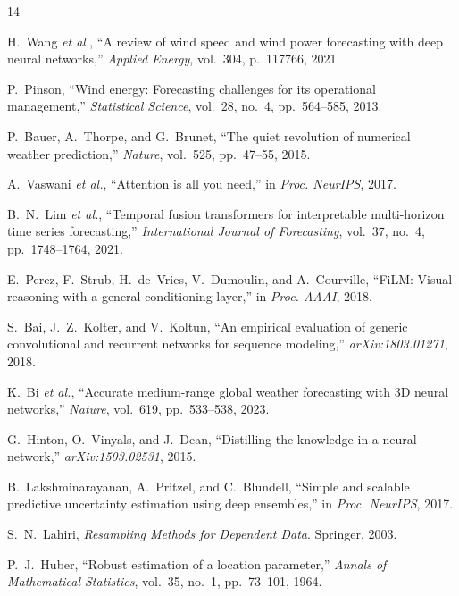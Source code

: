 \documentclass[conference]{IEEEtran}
\begin{document}

\begin{thebibliography}{14}

H.~Wang \textit{et al.}, ``A review of wind speed and wind power forecasting with deep neural networks,'' \textit{Applied Energy}, vol.~304, p.~117766, 2021.

P.~Pinson, ``Wind energy: Forecasting challenges for its operational management,'' \textit{Statistical Science}, vol.~28, no.~4, pp.~564--585, 2013.

P.~Bauer, A.~Thorpe, and G.~Brunet, ``The quiet revolution of numerical weather prediction,'' \textit{Nature}, vol.~525, pp.~47--55, 2015.

A.~Vaswani \textit{et al.}, ``Attention is all you need,'' in \textit{Proc. NeurIPS}, 2017.

B.~N.~Lim \textit{et al.}, ``Temporal fusion transformers for interpretable multi-horizon time series forecasting,'' \textit{International Journal of Forecasting}, vol.~37, no.~4, pp.~1748--1764, 2021.

E.~Perez, F.~Strub, H.~de~Vries, V.~Dumoulin, and A.~Courville, ``FiLM: Visual reasoning with a general conditioning layer,'' in \textit{Proc. AAAI}, 2018.

S.~Bai, J.~Z.~Kolter, and V.~Koltun, ``An empirical evaluation of generic convolutional and recurrent networks for sequence modeling,'' \textit{arXiv:1803.01271}, 2018.

K.~Bi \textit{et al.}, ``Accurate medium-range global weather forecasting with 3D neural networks,'' \textit{Nature}, vol.~619, pp.~533--538, 2023.

G.~Hinton, O.~Vinyals, and J.~Dean, ``Distilling the knowledge in a neural network,'' \textit{arXiv:1503.02531}, 2015.

B.~Lakshminarayanan, A.~Pritzel, and C.~Blundell, ``Simple and scalable predictive uncertainty estimation using deep ensembles,'' in \textit{Proc. NeurIPS}, 2017.

S.~N.~Lahiri, \textit{Resampling Methods for Dependent Data}. Springer, 2003.

P.~J.~Huber, ``Robust estimation of a location parameter,'' \textit{Annals of Mathematical Statistics}, vol.~35, no.~1, pp.~73--101, 1964.

\end{thebibliography}
\end{document}
